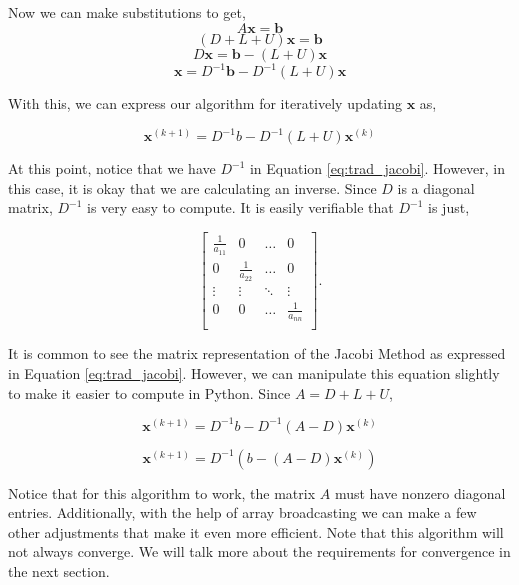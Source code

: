 Now we can make substitutions to get,
$$ A\mathbf{x} = \mathbf{b} $$
$$ (D + L + U)\mathbf{x} = \mathbf{b} $$
$$ D\mathbf{x} = \mathbf{b} - (L+U)\mathbf{x} $$
$$ \mathbf{x} = D^{-1}\mathbf{b} - D^{-1}(L+U)\mathbf{x} $$

With this, we can express our algorithm for iteratively updating $\mathbf{x}$ as,

\begin{equation} \label{eq:trad_jacobi}
\mathbf{x}^{(k+1)} = D^{-1}b - D^{-1}(L+U)\mathbf{x}^{(k)}
\end{equation}

At this point, notice that we have $D^{-1}$ in Equation \ref{eq:trad_jacobi}. However, in
this case, it is okay that we are calculating an inverse. Since $D$ is a diagonal
matrix, $D^{-1}$ is very easy to compute. It is easily verifiable that $D^{-1}$
is just,

$$
\begin{bmatrix}
\frac{1}{a_{11}} & 0 & \ldots & 0 \\
0 & \frac{1}{a_{22}} & \ldots & 0 \\
 \vdots & \vdots & \ddots & \vdots \\
0 & 0 & \ldots & \frac{1}{a_{nn}} \\
\end{bmatrix}.
$$

It is common to see the matrix representation of the Jacobi Method as expressed in
Equation \ref{eq:trad_jacobi}.
However, we can manipulate this equation slightly to make it easier to compute
in Python. Since $A = D + L + U$,

$$\mathbf{x}^{(k+1)} = D^{-1}b - D^{-1}(A-D)\mathbf{x}^{(k)} $$

\begin{equation} \label{eq:jacobi}
    \mathbf{x}^{(k+1)} = D^{-1}(b - (A-D)\mathbf{x}^{(k)})
\end{equation}

Notice that for this algorithm to
work, the matrix $A$ must have nonzero diagonal entries. Additionally, with the
help of array broadcasting we can make a few other adjustments that make it even
more efficient. Note that this algorithm will not always converge. We will talk
more about the requirements for convergence in the next section.

